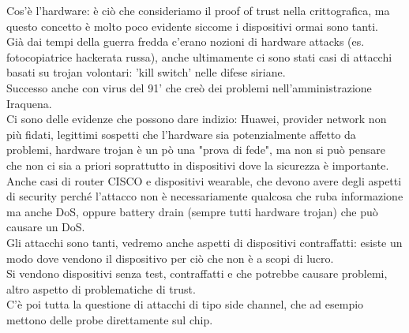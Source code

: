 \documentclass[oneside, 12pt]{extbook}
\begin{document}
Cos'è l'hardware: è ciò che consideriamo il proof of trust nella crittografica, ma questo concetto è molto poco evidente siccome i dispositivi ormai sono tanti.
\\Già dai tempi della guerra fredda c'erano nozioni di hardware attacks (es. fotocopiatrice hackerata russa), anche ultimamente ci sono stati casi di attacchi basati su trojan volontari: 'kill switch' nelle difese siriane.
\\Successo anche con virus del 91' che creò dei problemi nell'amministrazione Iraquena.
\\Ci sono delle evidenze che possono dare indizio: Huawei, provider network non più fidati, legittimi sospetti che l'hardware sia potenzialmente affetto da problemi, hardware trojan è un pò una "prova di fede", ma non si può pensare che non ci sia a priori soprattutto in dispositivi dove la sicurezza è importante.
\\Anche casi di router CISCO e dispositivi wearable, che devono avere degli aspetti di security perché l'attacco non è necessariamente qualcosa che ruba informazione ma anche DoS, oppure battery drain (sempre tutti hardware trojan) che può causare un DoS.
\\Gli attacchi sono tanti, vedremo anche aspetti di dispositivi contraffatti: esiste un modo dove vendono il dispositivo per ciò che non è a scopi di lucro.
\\Si vendono dispositivi senza test, contraffatti e che potrebbe causare problemi, altro aspetto di problematiche di trust.
\\C'è poi tutta la questione di attacchi di tipo side channel, che ad esempio mettono delle probe direttamente sul chip.
\end{document}
